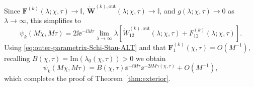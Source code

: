 Since $\mathbf{F}^{(k)}(\lambda;\chi,\tau)\to\mathbb{I}$, $\dot{\mathbf{W}}^{(k),\mathrm{out}}(\lambda;\chi,\tau)\to\mathbb{I}$, and $g(\lambda;\chi,\tau)\to 0$ as $\lambda\to\infty$, this simplifies to
\begin{equation}
\psi_k(M\chi,M\tau)=2\ii\ee^{-\ii M\tau}\lim_{\lambda\to\infty}\lambda\left[\dot{W}^{(k),\mathrm{out}}_{12}(\lambda;\chi,\tau) +F^{(k)}_{12}(\lambda;\chi,\tau)\right].
\end{equation}
Using \eqref{eq:outer-parametrix-Schi-Stau-ALT} and that $\mathbf{F}_1^{(k)}(\chi,\tau)=O(M^{-1})$, recalling $B(\chi,\tau)=\mathrm{Im}(\lambda_0(\chi,\tau))>0$ we obtain 
\begin{equation}
\psi_k(M\chi,M\tau)=B(\chi,\tau)\ee^{-\ii M\tau}\ee^{-2\ii M\gamma(\chi,\tau)} + O(M^{-1}),
\label{eq:psi-k-shelves-chi-tau-ALT}
\end{equation}
which completes the proof of Theorem~\ref{thm:exterior}.
